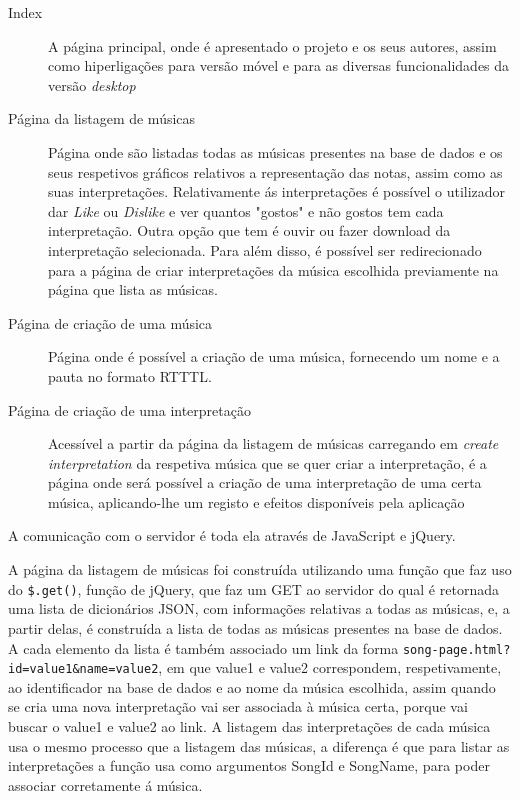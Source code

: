 \documentclass[a4paper,11pt,openright,oneside]{report}
\begin{document}
\begin{description}
\item[Index]
A página principal, onde é apresentado o projeto e os seus autores, assim como hiperligações para versão móvel e para as diversas funcionalidades da versão \textit{desktop}
\item[Página da listagem de músicas]
Página onde são listadas todas as músicas presentes na base de dados e os seus respetivos gráficos relativos a representação das notas, assim como as suas interpretações. Relativamente ás interpretações é possível o utilizador dar \textit{Like} ou \textit{Dislike} e ver quantos "gostos" e não gostos tem cada interpretação. Outra opção que tem é ouvir ou fazer download da interpretação selecionada. Para além disso, é possível ser redirecionado para a página de criar interpretações da música escolhida previamente na página que lista as músicas. 
\item[Página de criação de uma música]
Página onde é possível a criação de uma música, fornecendo um nome e a pauta no formato RTTTL.
\item[Página de criação de uma interpretação]
Acessível a partir da página da listagem de músicas carregando em \textit{create interpretation} da respetiva música que se quer criar a interpretação, é a página onde será possível a criação de uma interpretação de uma certa música, aplicando-lhe um registo e efeitos disponíveis pela aplicação
\end{description}

A comunicação com o servidor é toda ela através de JavaScript e jQuery.

A página da listagem de músicas foi construída utilizando uma função que faz uso do \texttt{\$.get()}, função de jQuery, que faz um GET ao servidor do qual é retornada uma lista de dicionários JSON, com informações relativas a todas as músicas, e, a partir delas, é construída a lista de todas as músicas presentes na base de dados. A cada elemento da lista é também associado um link da forma \texttt{song-page.html?id=value1\&name=value2}, em que value1 e value2 correspondem, respetivamente, ao identificador na base de dados e ao nome da música escolhida, assim quando se cria uma nova interpretação vai ser associada à música certa, porque vai buscar o value1 e value2 ao link. A listagem das interpretações de cada música usa o mesmo processo que a listagem das músicas, a diferença é que para listar as interpretações a função usa como argumentos SongId e SongName, para poder associar corretamente á música.
\end{document}
